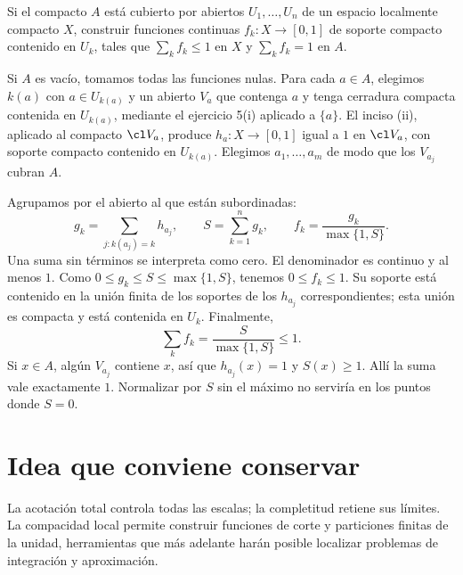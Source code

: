 \begin{ejercicio}
Si el compacto $A$ está cubierto por abiertos $U_1,\ldots,U_n$ de un espacio localmente compacto $X$, construir funciones continuas $f_k:X\to[0,1]$ de soporte compacto contenido en $U_k$, tales que $\sum_k f_k\le1$ en $X$ y $\sum_kf_k=1$ en $A$.
\end{ejercicio}
\begin{solucion}
Si $A$ es vacío, tomamos todas las funciones nulas. Para cada $a\in A$, elegimos $k(a)$ con $a\in U_{k(a)}$ y un abierto $V_a$ que contenga $a$ y tenga cerradura compacta contenida en $U_{k(a)}$, mediante el ejercicio 5(i) aplicado a $\{a\}$. El inciso (ii), aplicado al compacto $\cl V_a$, produce $h_a:X\to[0,1]$ igual a $1$ en $\cl V_a$, con soporte compacto contenido en $U_{k(a)}$. Elegimos $a_1,\ldots,a_m$ de modo que los $V_{a_j}$ cubran $A$.

Agrupamos por el abierto al que están subordinadas:
\[
g_k=\sum_{j:k(a_j)=k}h_{a_j},\qquad S=\sum_{k=1}^n g_k,\qquad
f_k=\frac{g_k}{\max\{1,S\}}.
\]
Una suma sin términos se interpreta como cero. El denominador es continuo y al menos $1$. Como $0\le g_k\le S\le\max\{1,S\}$, tenemos $0\le f_k\le1$. Su soporte está contenido en la unión finita de los soportes de los $h_{a_j}$ correspondientes; esta unión es compacta y está contenida en $U_k$. Finalmente,
\[
\sum_k f_k=\frac S{\max\{1,S\}}\le1.
\]
Si $x\in A$, algún $V_{a_j}$ contiene $x$, así que $h_{a_j}(x)=1$ y $S(x)\ge1$. Allí la suma vale exactamente $1$. Normalizar por $S$ sin el máximo no serviría en los puntos donde $S=0$.
\end{solucion}

\section{Idea que conviene conservar}
La acotación total controla todas las escalas; la completitud retiene sus límites. La compacidad local permite construir funciones de corte y particiones finitas de la unidad, herramientas que más adelante harán posible localizar problemas de integración y aproximación.
